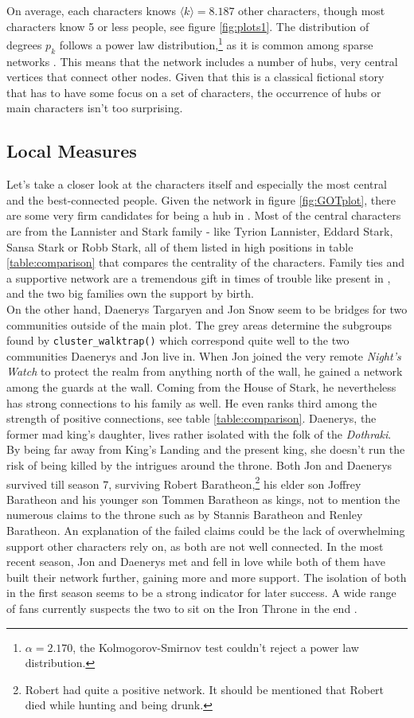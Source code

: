 On average, each characters knows $\langle k \rangle = 8.187$ other characters, though most characters know 5 or less people, see figure \ref{fig:plots1}. The distribution of degrees $p_k$ follows a power law distribution,\footnote{$\alpha = 2.170$, the Kolmogorov-Smirnov test couldn't reject a power law distribution.} as it is common among sparse networks \citep{RevModPhys.74.47}. This means that the network includes a number of hubs, very central vertices that connect other nodes. Given that this is a classical fictional story that has to have some focus on a set of characters, the occurrence of hubs or main characters isn't too surprising. 



\newpage
\subsection{Local Measures}
Let's take a closer look at the characters itself and especially the most central and the best-connected people. Given the network in figure \ref{fig:GOTplot}, there are some very firm candidates for being a hub in \got. Most of the central characters are  from the Lannister and Stark family - like Tyrion Lannister, Eddard Stark, Sansa Stark or Robb Stark, all of them listed in high positions in table \ref{table:comparison} that compares the centrality of the characters. Family ties and a supportive network are a tremendous gift in times of trouble like present in \got, and the two big families own the support by birth.\\
On the other hand, Daenerys Targaryen and Jon Snow seem to be bridges for two communities outside of the main plot. The grey areas determine the subgroups found by \texttt{cluster\_walktrap()} which correspond quite well to the two communities Daenerys and Jon live in. When Jon joined the very remote \textit{Night's Watch} to protect the realm from anything north of the wall, he gained a network among the guards at the wall. Coming from the House of Stark, he nevertheless has strong connections to his family as well. He even ranks third among the strength of positive connections, see table \ref{table:comparison}. Daenerys, the former mad king's daughter, lives rather isolated with the folk of the \textit{Dothraki}. By being far away from King's Landing and the present king, she doesn't run the risk of being killed by the intrigues around the throne. Both Jon and Daenerys survived till season 7, surviving Robert Baratheon,\footnote{Robert had quite a positive network. It should be mentioned that Robert died while hunting and being drunk.} his elder son Joffrey Baratheon and his younger son Tommen Baratheon as kings, not to mention the numerous claims to the throne such as by Stannis Baratheon and Renley Baratheon. An explanation of the failed claims could be the lack of overwhelming support other characters rely on, as both are not well connected. In the most recent season, Jon and Daenerys met and fell in love while both of them have built their network further, gaining more and more support. The isolation of both in the first season seems to be a strong indicator for later success. A wide range of fans currently suspects the two to sit on the Iron Throne in the end \citep{ziss_9_2018}.\\
